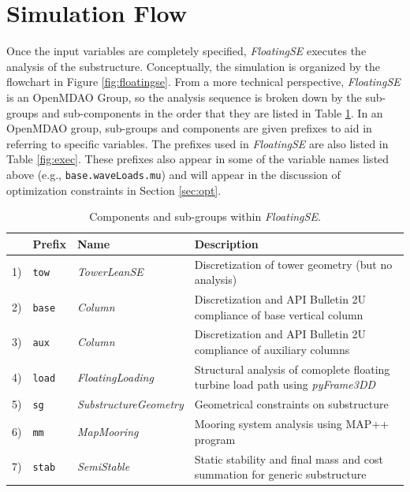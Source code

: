 \section{Simulation Flow}
Once the input variables are completely specified, \textit{FloatingSE}
executes the analysis of the substructure.  Conceptually, the simulation
is organized by the flowchart in Figure \ref{fig:floatingse}.  From a
more technical perspective, \textit{FloatingSE} is an OpenMDAO Group, so
the analysis sequence is broken down by the sub-groups and
sub-components in the order that they are listed in Table
\ref{tbl:exec}.  In an OpenMDAO group, sub-groups and components are
given prefixes to aid in referring to specific variables.  The prefixes
used in \textit{FloatingSE} are also listed in Table \ref{fig:exec}.
These prefixes also appear in some of the variable names listed above (e.g.,
\texttt{base.waveLoads.mu}) and will appear in the discussion of
optimization constraints in Section \ref{sec:opt}.

\begin{table}[htbp] \begin{center}
    \caption{Components and sub-groups within \textit{FloatingSE}.}
    \label{tbl:exec}
{\small
  \begin{tabular}{ l l l l } \hline
    &  \textbf{Prefix} & \textbf{Name} & \textbf{Description} \\ \hline\hline
    1) & \texttt{tow} & \textit{TowerLeanSE} & Discretization of tower
    geometry (but no analysis) \\
    2) & \texttt{base} & \textit{Column} & Discretization and API
    Bulletin 2U compliance of base vertical column \\
    3) & \texttt{aux} & \textit{Column} & Discretization and API
    Bulletin 2U compliance of auxiliary columns \\
    4) & \texttt{load} & \textit{FloatingLoading} & Structural analysis
    of comoplete floating turbine load path using \textit{pyFrame3DD} \\
    5) & \texttt{sg} & \textit{SubstructureGeometry} & Geometrical constraints
    on substructure \\
    6) & \texttt{mm} & \textit{MapMooring} & Mooring system analysis using MAP++ program \\
    7) & \texttt{stab} & \textit{SemiStable} & Static stability and final mass and cost summation for generic substructure \\
  \hline \end{tabular}
}
\end{center} \end{table}

